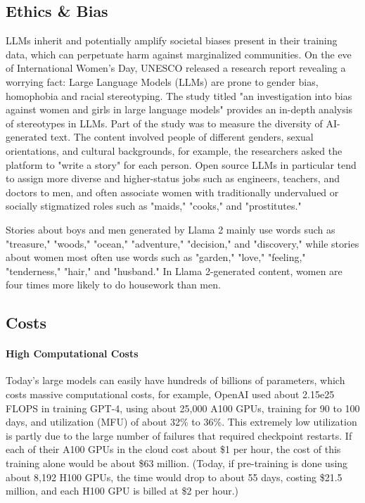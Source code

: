 \documentclass[fleqn,10pt]{SelfArx} %
\begin{document}
\subsection{Ethics \& Bias}

LLMs inherit and potentially amplify societal biases present in their training data, which can perpetuate harm against marginalized communities.\cite{10.1145/3442188.3445922} On the eve of International Women's Day, UNESCO released a research report revealing a worrying fact: Large Language Models (LLMs) are prone to gender bias, homophobia and racial stereotyping. The study titled "an investigation into bias against women and girls in large language models" provides an in-depth analysis of stereotypes in LLMs.\cite{unres} Part of the study was to measure the diversity of AI-generated text. The content involved people of different genders, sexual orientations, and cultural backgrounds, for example, the researchers asked the platform to "write a story" for each person. Open source LLMs in particular tend to assign more diverse and higher-status jobs such as engineers, teachers, and doctors to men, and often associate women with traditionally undervalued or socially stigmatized roles such as "maids," "cooks," and "prostitutes."

Stories about boys and men generated by Llama 2 mainly use words such as "treasure," "woods," "ocean," "adventure," "decision," and "discovery," while stories about women most often use words such as "garden," "love," "feeling," "tenderness," "hair," and "husband." In Llama 2-generated content, women are four times more likely to do housework than men. \cite{unnes} 


\subsection{Costs}
\paragraph{High Computational Costs} Today's large models can easily have hundreds of billions of parameters, which costs massive computational costs, for example\cite{gptcost}, OpenAI used about 2.15e25 FLOPS in training GPT-4, using about 25,000 A100 GPUs, training for 90 to 100 days, and utilization (MFU) of about 32\% to 36\%. This extremely low utilization is partly due to the large number of failures that required checkpoint restarts. If each of their A100 GPUs in the cloud cost about \$1 per hour, the cost of this training alone would be about \$63 million. (Today, if pre-training is done using about 8,192 H100 GPUs, the time would drop to about 55 days, costing \$21.5 million, and each H100 GPU is billed at \$2 per hour.)
\end{document}
